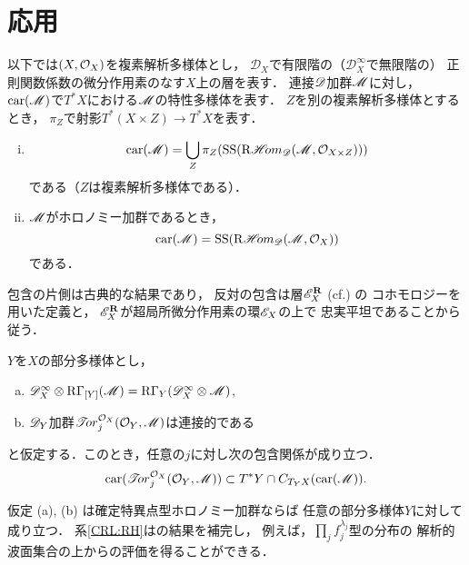\section{応用}

以下では\((X,\OO_X)\)を複素解析多様体とし，
\(\mathscr{D}_X\)で有限階の（\(\mathscr{D}^\infty_X\)で無限階の）
正則関数係数の微分作用素のなす\(X\)上の層を表す．
連接\(\D\)加群\(\scM\)に対し，
\(\car(\scM)\)で\(T^\ast X\)における\(\scM\)の特性多様体を表す．
\(Z\)を別の複素解析多様体とするとき，
\(\pi_Z\)で射影\(T^\ast(X\times Z)\to T^\ast X\)を表す．

\begin{PRP}
    \begin{enumerate}[(i)]
        \item \[\car(\scM)=\bigcup_Z\pi_Z(\muS(\RHOM_{\scD}(\scM,\OO_{X\times Z})))\]である（\(Z\)は複素解析多様体である）．
        \item \(\scM\)がホロノミー加群であるとき，\[
            \car(\scM)=\muS(\RHOM_{\scD}(\scM,\OO_{X}))
        \]である．
    \end{enumerate}
\end{PRP}

包含の片側は古典的な結果\cite{Kas77}であり，
反対の包含は層\(\scE_X^\rr\) (cf.\cite{SKK,Kas77}) の
コホモロジーを用いた定義と，
\(\scE_X^\rr\)が超局所微分作用素の環\(\scE_X\)の上で
忠実平坦であることから従う．

\begin{CRL}\label{CRL:RH}
    \(Y\)を\(X\)の部分多様体とし，
    \begin{enumerate}[(a)]
        \item \(\scD_X^\infty\otimes\RG_{[Y]}(\scM)=\RG_Y(\scD_X^\infty\otimes\scM)\),
        \item \(\scD_Y\)加群\({\TOR}_j^{\OO_X}(\OO_Y,\scM)\)は連接的である
    \end{enumerate}
    と仮定する．このとき，任意の\(j\)に対し次の包含関係が成り立つ．
    \[
        \car(\TOR_j^{\OO_X}(\OO_Y,\scM))\subset
        T^\ast Y\cap C_{T_Y X}(\car(\scM)).
    \]
\end{CRL}
仮定 (a), (b) は確定特異点型ホロノミー加群ならば
任意の部分多様体\(Y\)に対して成り立つ\cite{KK81}．
系\ref{CRL:RH}は\cite{KK81}の結果を補完し，
例えば，\(\prod_j f_j^{\lambda_j}\)型の分布の
解析的波面集合の上からの評価を得ることができる．

